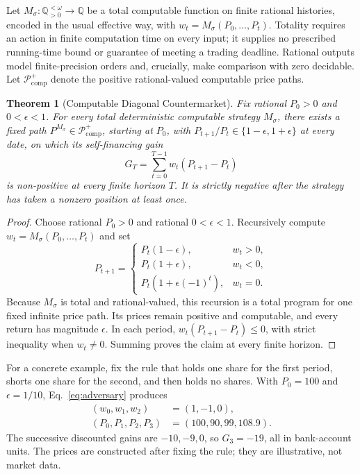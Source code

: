 \documentclass[aps,pra,reprint,superscriptaddress,amsmath,amssymb,floatfix]{revtex4-2}
\theoremstyle{plain}
\newtheorem{theorem}{Theorem}
\theoremstyle{definition}
\theoremstyle{remark}
\begin{document}
Let
\(M_\sigma\colon\mathbb Q_{>0}^{<\omega}\to\mathbb Q\)
be a total computable function on finite rational histories, encoded in the
usual effective way, with \(w_t=M_\sigma(P_0,\ldots,P_t)\).
Totality requires an
action in finite computation time on every input; it supplies no prescribed
running-time bound or guarantee of meeting a trading deadline. Rational outputs
model finite-precision orders and, crucially, make comparison with zero
decidable. Let \(\mathcal P_{\mathrm{comp}}^{+}\) denote the positive
rational-valued computable price paths.

\begin{samepage}
\begin{theorem}[Computable Diagonal Countermarket]
  \label{thm:counterpath}
  Fix rational \(P_0>0\) and \(0<\epsilon<1\). For every total deterministic
  computable strategy \(M_\sigma\), there exists a fixed path
  \(P^{M_\sigma}\in\mathcal P_{\mathrm{comp}}^{+}\), starting at \(P_0\), with
  \(P_{t+1}/P_t\in\{1-\epsilon,1+\epsilon\}\) at every date, on which its
  self-financing gain
  \[
    G_T=\sum_{t=0}^{T-1}w_t(P_{t+1}-P_t)
  \]
  is non-positive at every finite horizon \(T\). It is strictly negative after
  the strategy has taken a nonzero position at least once.
\end{theorem}
\end{samepage}

\begin{proof}
Choose rational \(P_0>0\) and rational \(0<\epsilon<1\). Recursively compute
\(w_t=M_\sigma(P_0,\ldots,P_t)\) and set
\begin{equation}
P_{t+1}=
\begin{cases}
P_t(1-\epsilon),&w_t>0,\\
P_t(1+\epsilon),&w_t<0,\\
P_t(1+\epsilon(-1)^t),&w_t=0.
\end{cases}
\label{eq:adversary}
\end{equation}
Because \(M_\sigma\) is total and rational-valued, this recursion is a total
program for one fixed infinite price path. Its prices remain positive and
computable, and every return has magnitude \(\epsilon\). In each period,
\(w_t(P_{t+1}-P_t)\leq0\), with strict inequality when \(w_t\neq0\).
Summing proves the claim at every finite horizon.
\end{proof}

For a concrete example, fix the rule that holds one share for the first
period, shorts one share for the second, and then holds no shares. With
\(P_0=100\) and \(\epsilon=1/10\), Eq.~\eqref{eq:adversary} produces
\begin{align*}
  (w_0,w_1,w_2)&=(1,-1,0),\\
  (P_0,P_1,P_2,P_3)&=(100,90,99,108.9).
\end{align*}
The successive discounted gains are \(-10,-9,0\), so \(G_3=-19\), all in
bank-account units. The prices are constructed after fixing the rule; they
are illustrative, not market data.
\end{document}
